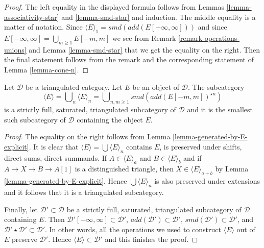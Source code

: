 \begin{proof}
The left equality in the displayed formula follows from
Lemmas \ref{lemma-associativity-star} and \ref{lemma-smd-star}
and induction. The middle equality is a matter of notation.
Since $\langle E \rangle_1 = smd(add(E[-\infty, \infty]))$
and since $E[-\infty, \infty] = \bigcup_{m \geq 1} E[-m, m]$
we see from Remark \ref{remark-operations-unions} and
Lemma \ref{lemma-smd-star} that we get the equality on the right.
Then the final statement follows from the remark and the
corresponding statement of Lemma \ref{lemma-cone-n}.
\end{proof}

\begin{lemma}
\label{lemma-find-smallest-containing-E}
Let $\mathcal{D}$ be a triangulated category. Let $E$ be an object
of $\mathcal{D}$. The subcategory
$$
\langle E \rangle = \bigcup\nolimits_n \langle E \rangle_n
= \bigcup\nolimits_{n, m \geq 1} smd(add(E[-m, m])^{\star n})
$$
is a strictly full, saturated, triangulated subcategory of $\mathcal{D}$
and it is the smallest such subcategory of $\mathcal{D}$ containing
the object $E$.
\end{lemma}

\begin{proof}
The equality on the right follows from
Lemma \ref{lemma-generated-by-E-explicit}.
It is clear that $\langle E \rangle = \bigcup \langle E \rangle_n$
contains $E$, is preserved under shifts, direct sums, direct summands.
If $A \in \langle E \rangle_a$ and $B \in \langle E \rangle_b$
and if $A \to X \to B \to A[1]$ is a distinguished triangle, then
$X \in \langle E \rangle_{a + b}$ by Lemma \ref{lemma-generated-by-E-explicit}.
Hence $\bigcup \langle E \rangle_n$ is also preserved under extensions
and it follows that it is a triangulated subcategory. 

\medskip\noindent
Finally, let $\mathcal{D}' \subset \mathcal{D}$ be a 
strictly full, saturated, triangulated subcategory of $\mathcal{D}$
containing $E$. Then
$\mathcal{D}'[-\infty, \infty] \subset \mathcal{D}'$,
$add(\mathcal{D}') \subset \mathcal{D}'$,
$smd(\mathcal{D}') \subset \mathcal{D}'$, and
$\mathcal{D}' \star \mathcal{D}' \subset \mathcal{D}'$.
In other words, all the operations we used to construct
$\langle E \rangle$ out of $E$ preserve $\mathcal{D}'$.
Hence $\langle E \rangle \subset \mathcal{D}'$ and this
finishes the proof.
\end{proof}

